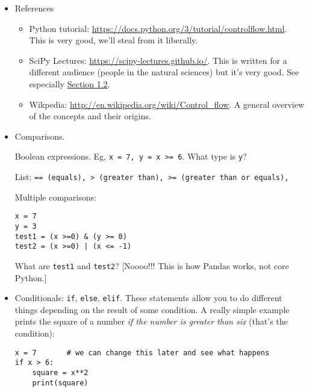 \documentclass[11pt]{article}
\begin{document}
%
\begin{itemize}
\item References
\begin{itemize}
\item Python tutorial:  \url{https://docs.python.org/3/tutorial/controlflow.html}.
This is very good, we'll steal from it liberally.

\item SciPy Lectures:  \url{https://scipy-lectures.github.io/}.
This is written for a different audience (people in the natural sciences)
but it's very good.
See especially \href{https://scipy-lectures.github.io/intro/language/python_language.html}{Section 1.2}.

\item Wikpedia:  \url{http://en.wikipedia.org/wiki/Control_flow}.
A general overview of the concepts and their origins.
\end{itemize}

\begin{comment}

Separate sections for conditionals and loops

Overview.  Have picture for conditional statement:  if (condition) is True, do one thing, if false
do another

Conditions (Boolean expressions).
5 == 6
5==5
'Dave' > 'Glenn'

Compound conditions. ??

Loops
i = 0.1
Use a loop over n to determine how many periods it takes to double your money.
That is, find the first n for which (1+i)**n > 2.

Check Comm 64, Coursera, etc for examples

\end{comment}

\item Comparisons.

Boolean expressions. Eg, {\tt x = 7, y = x >= 6}.
What type is {\tt y}?

List:  {\tt == (equals), > (greater than), >= (greater than or equals), }

Multiple comparisons:
\begin{verbatim}
x = 7
y = 3
test1 = (x >=0) & (y >= 0)
test2 = (x >=0) | (x <= -1)
\end{verbatim}
What are {\tt test1} and {\tt test2}?
[Noooo!!!  This is how Pandas works, not core Python.]

\item Conditionals: {\tt if}, {\tt else}, {\tt elif}.
These statements allow you to do different things depending
on the result of some condition.  A really simple example
prints the square of a number {\it if the number is greater than six\/}
(that's the condition):
%
\begin{verbatim}
x = 7       # we can change this later and see what happens
if x > 6:
    square = x**2
    print(square)


\end{verbatim}
\end{itemize}
\end{document}

